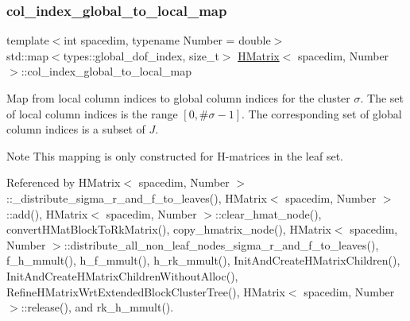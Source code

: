 \mbox{\label{classHMatrix_ab337c7b4f2f40699b9b7f3ab17a1e056}} 
\subsubsection{\texorpdfstring{col\+\_\+index\+\_\+global\+\_\+to\+\_\+local\+\_\+map}{col\_index\_global\_to\_local\_map}}
{\footnotesize\ttfamily template$<$int spacedim, typename Number = double$>$ \\
std\+::map$<$types\+::global\+\_\+dof\+\_\+index, size\+\_\+t$>$ \hyperlink{classHMatrix}{H\+Matrix}$<$ spacedim, Number $>$\+::col\+\_\+index\+\_\+global\+\_\+to\+\_\+local\+\_\+map\hspace{0.3cm}{\ttfamily [private]}}

Map from local column indices to global column indices for the cluster $\sigma$. The set of local column indices is the range $[0, \#\sigma - 1]$. The corresponding set of global column indices is a subset of $J$.


\begin{DoxyDescription}
\item[Note ]This mapping is only constructed for H-\/matrices in the leaf set. 
\end{DoxyDescription}

Referenced by H\+Matrix$<$ spacedim, Number $>$\+::\+\_\+distribute\+\_\+sigma\+\_\+r\+\_\+and\+\_\+f\+\_\+to\+\_\+leaves(), H\+Matrix$<$ spacedim, Number $>$\+::add(), H\+Matrix$<$ spacedim, Number $>$\+::clear\+\_\+hmat\+\_\+node(), convert\+H\+Mat\+Block\+To\+Rk\+Matrix(), copy\+\_\+hmatrix\+\_\+node(), H\+Matrix$<$ spacedim, Number $>$\+::distribute\+\_\+all\+\_\+non\+\_\+leaf\+\_\+nodes\+\_\+sigma\+\_\+r\+\_\+and\+\_\+f\+\_\+to\+\_\+leaves(), f\+\_\+h\+\_\+mmult(), h\+\_\+f\+\_\+mmult(), h\+\_\+rk\+\_\+mmult(), Init\+And\+Create\+H\+Matrix\+Children(), Init\+And\+Create\+H\+Matrix\+Children\+Without\+Alloc(), Refine\+H\+Matrix\+Wrt\+Extended\+Block\+Cluster\+Tree(), H\+Matrix$<$ spacedim, Number $>$\+::release(), and rk\+\_\+h\+\_\+mmult().

\mbox{\label{classHMatrix_ac30ae65e37ec5e4ccc7de2f6b9ea91e6}} 
